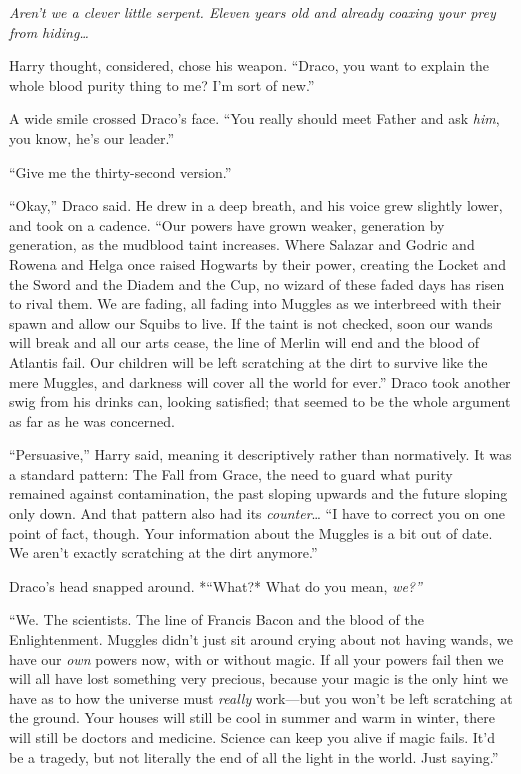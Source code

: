 \emph{Aren't we a clever little serpent. Eleven years old and already
coaxing your prey from hiding\ldots{}}

Harry thought, considered, chose his weapon. ``Draco, you want to
explain the whole blood purity thing to me? I'm sort of new.''

A wide smile crossed Draco's face. ``You really should meet Father and
ask \emph{him}, you know, he's our leader.''

``Give me the thirty-second version.''

``Okay,'' Draco said. He drew in a deep breath, and his voice grew
slightly lower, and took on a cadence. ``Our powers have grown weaker,
generation by generation, as the mudblood taint increases. Where Salazar
and Godric and Rowena and Helga once raised Hogwarts by their power,
creating the Locket and the Sword and the Diadem and the Cup, no wizard
of these faded days has risen to rival them. We are fading, all fading
into Muggles as we interbreed with their spawn and allow our Squibs to
live. If the taint is not checked, soon our wands will break and all our
arts cease, the line of Merlin will end and the blood of Atlantis fail.
Our children will be left scratching at the dirt to survive like the
mere Muggles, and darkness will cover all the world for ever.'' Draco
took another swig from his drinks can, looking satisfied; that seemed to
be the whole argument as far as he was concerned.

``Persuasive,'' Harry said, meaning it descriptively rather than
normatively. It was a standard pattern: The Fall from Grace, the need to
guard what purity remained against contamination, the past sloping
upwards and the future sloping only down. And that pattern also had its
\emph{counter}\ldots{} ``I have to correct you on one point of fact,
though. Your information about the Muggles is a bit out of date. We
aren't exactly scratching at the dirt anymore.''

Draco's head snapped around. *``What?* What do you mean, \emph{we?''}

``We. The scientists. The line of Francis Bacon and the blood of the
Enlightenment. Muggles didn't just sit around crying about not having
wands, we have our \emph{own} powers now, with or without magic. If all
your powers fail then we will all have lost something very precious,
because your magic is the only hint we have as to how the universe must
\emph{really} work---but you won't be left scratching at the ground.
Your houses will still be cool in summer and warm in winter, there will
still be doctors and medicine. Science can keep you alive if magic
fails. It'd be a tragedy, but not literally the end of all the light in
the world. Just saying.''

